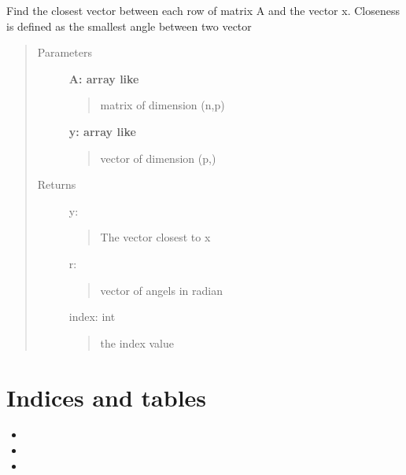 \documentclass[letterpaper,10pt,english]{sphinxmanual}
\begin{document}
\begin{fulllineitems}
Find the closest vector between each row of matrix A and the vector x.  
Closeness is defined as the smallest angle between two vector
\begin{quote}\begin{description}
\item[{Parameters}] \leavevmode
\textbf{A: array like}
\begin{quote}

matrix of dimension (n,p)
\end{quote}

\textbf{y: array like}
\begin{quote}

vector of dimension (p,)
\end{quote}

\item[{Returns}] \leavevmode
y: 
\begin{quote}

The vector closest to x
\end{quote}

r: 
\begin{quote}

vector of angels in radian
\end{quote}

index: int
\begin{quote}

the index value
\end{quote}

\end{description}\end{quote}

\end{fulllineitems}



\chapter{Indices and tables}
\label{index:indices-and-tables}\begin{itemize}
\item {} 

\item {} 

\item {} 

\end{itemize}



\renewcommand{\indexname}{Index}
\printindex
\end{document}
